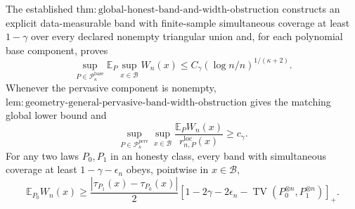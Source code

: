 The established \(\mathrm{thm:global\text{-}honest\text{-}band\text{-}and\text{-}width\text{-}obstruction}\) constructs an explicit data-measurable band with finite-sample simultaneous coverage at least \(1-\gamma\) over every declared nonempty triangular union and, for each polynomial base component, proves
\[
 \sup_{P\in\mathcal P_{\kappa}^{\mathrm{base}}}
 \mathbb E_P\sup_{x\in\mathcal B}W_n(x)
 \le C_\gamma(\log n/n)^{1/(\kappa+2)}.
\]
Whenever the pervasive component is nonempty, \(\mathrm{lem:geometry\text{-}general\text{-}pervasive\text{-}band\text{-}width\text{-}obstruction}\) gives the matching global lower bound and
\[
 \sup_{P\in\mathcal P_{\kappa}^{\mathrm{perv}}}\sup_{x\in\mathcal B}
 \frac{\mathbb E_PW_n(x)}{r_{n,P}^{\mathrm{loc}}(x)}\ge c_\gamma.
\]
For any two laws \(P_0,P_1\) in an honesty class, every band with simultaneous coverage at least \(1-\gamma-\epsilon_n\) obeys, pointwise in \(x\in\mathcal B\),
\[
 \mathbb E_{P_0}W_n(x)\ge
 \frac{|\tau_{P_1}(x)-\tau_{P_0}(x)|}{2}
 \left[1-2\gamma-2\epsilon_n-
 \operatorname{TV}(P_0^{\otimes n},P_1^{\otimes n})\right]_+.
\]
